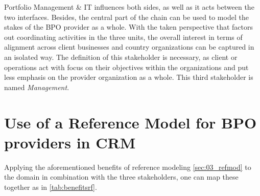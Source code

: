  Portfolio Management \& IT influences both sides, as well as it acts between the two interfaces. Besides, the central part of the chain can be used to model the stakes of the BPO provider as a whole. With the taken perspective that factors out coordinating activities in the three units, the overall interest in terms of alignment across client businesses and country organizations can be captured in an isolated way. The definition of this stakeholder is necessary, as client or operations act with focus on their objectives within the organizations and put less emphasis on the provider organization as a whole. This third stakeholder is named \textit{Management}. 
  

\section{Use of a Reference Model for BPO providers in CRM}

Applying the aforementioned benefits of reference modeling \ref{sec:03_refmod} to the domain in combination with the three stakeholders, one can map these together as in \Tab \ref{tab:benefitsrf}. 

